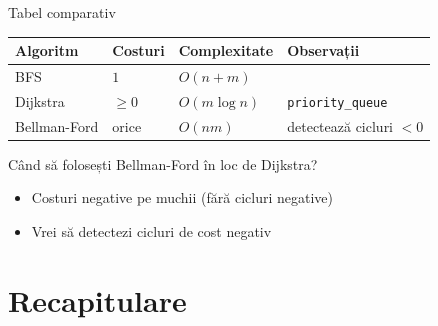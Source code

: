 \documentclass[10pt]{beamer}
\begin{document}
\begin{frame}{Tabel comparativ}
  \begin{center}
  \begin{tabular}{llll}
    \toprule
    Algoritm & Costuri & Complexitate & Observații \\
    \midrule
    BFS & $1$ & $O(n+m)$ & \textemdash{} \\
    Dijkstra & $\geq 0$ & $O(m\log n)$ & \texttt{priority\_queue} \\
    Bellman-Ford & orice & $O(nm)$ & detectează cicluri $<0$ \\
    \bottomrule
  \end{tabular}
  \end{center}

  \begin{alertblock}{Când să folosești Bellman-Ford în loc de Dijkstra?}
    \begin{itemize}
      \item Costuri negative pe muchii (fără cicluri negative)
      \item Vrei să detectezi cicluri de cost negativ
    \end{itemize}
  \end{alertblock}
\end{frame}

\section{Recapitulare}
\end{document}
